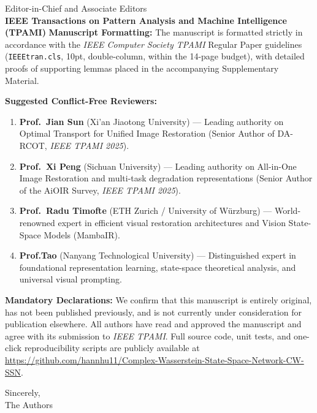 \documentclass[11pt]{letter}
\begin{document}
\begin{letter}{Editor-in-Chief and Associate Editors\\
\textbf{IEEE Transactions on Pattern Analysis and Machine Intelligence (TPAMI)}}
\textbf{Manuscript Formatting:} The manuscript is formatted strictly in accordance with the \emph{IEEE Computer Society TPAMI} Regular Paper guidelines (\texttt{IEEEtran.cls}, 10pt, double-column, within the 14-page budget), with detailed proofs of supporting lemmas placed in the accompanying Supplementary Material.

\vspace{0.5em}
\textbf{Suggested Conflict-Free Reviewers:}
\begin{enumerate}
    \item \textbf{Prof.\ Jian Sun} (Xi'an Jiaotong University) --- Leading authority on Optimal Transport for Unified Image Restoration (Senior Author of DA-RCOT, \emph{IEEE TPAMI 2025}).
    \item \textbf{Prof.\ Xi Peng} (Sichuan University) --- Leading authority on All-in-One Image Restoration and multi-task degradation representations (Senior Author of the AiOIR Survey, \emph{IEEE TPAMI 2025}).
    \item \textbf{Prof.\ Radu Timofte} (ETH Zurich / University of W\"urzburg) --- World-renowned expert in efficient visual restoration architectures and Vision State-Space Models (MambaIR).
    \item \textbf{Prof.\Dacheng Tao} (Nanyang Technological University) --- Distinguished expert in foundational representation learning, state-space theoretical analysis, and universal visual prompting.
\end{enumerate}

\vspace{0.5em}
\textbf{Mandatory Declarations:} We confirm that this manuscript is entirely original, has not been published previously, and is not currently under consideration for publication elsewhere. All authors have read and approved the manuscript and agree with its submission to \emph{IEEE TPAMI}. Full source code, unit tests, and one-click reproducibility scripts are publicly available at \url{https://github.com/hannhu11/Complex-Wasserstein-State-Space-Network-CW-SSN}.

\closing{Sincerely,\\
The Authors}

\end{letter}
\end{document}
